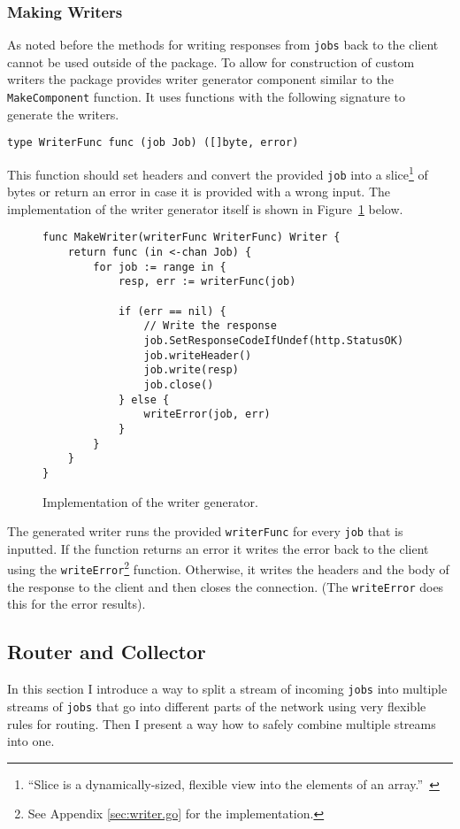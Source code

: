 \subsubsection{Making Writers}
As noted before the methods for writing responses from \texttt{jobs}
back to the client cannot be used outside of the package. To allow
for construction of custom writers the package provides writer generator
component similar to the \texttt{MakeComponent} function. It uses 
functions with the following signature to generate the writers.
\begin{lstlisting}
type WriterFunc func (job Job) ([]byte, error)
\end{lstlisting}
This function should set headers and convert the provided \texttt{job} into 
a slice\footnote{``Slice is a dynamically-sized, flexible view into the elements 
of an array.''~\cite{tour}} of bytes or return an error in case it 
is provided with a 
wrong input. The implementation of the writer generator itself is shown
in Figure~\ref{fig:MakeWriter} below.
\begin{figure}[h]
\centering
\begin{lstlisting}
func MakeWriter(writerFunc WriterFunc) Writer {
    return func (in <-chan Job) {
        for job := range in {
            resp, err := writerFunc(job)

            if (err == nil) {
                // Write the response
                job.SetResponseCodeIfUndef(http.StatusOK)
                job.writeHeader()
                job.write(resp)
                job.close()
            } else {
                writeError(job, err)
            }
        }       
    }
}
\end{lstlisting}
\caption[scale=1.0]{Implementation of the writer generator.}
\label{fig:MakeWriter}
\end{figure}

The generated writer runs the provided \texttt{writerFunc} for every \texttt{job} 
that is inputted. If the function returns an error it writes the error 
back to the client using the \texttt{writeError}\footnote{See Appendix 
\ref{sec:writer.go} for the implementation.} function. Otherwise, it 
writes the headers and the body of the response to the client and then 
closes the connection. (The \texttt{writeError} does this for the error
results).

\subsection{Router and Collector}
In this section I introduce a way to split a stream of incoming \texttt{jobs} into
multiple streams of \texttt{jobs} that go into different parts of the network
using very flexible rules for routing. Then I present a way how to
safely combine multiple streams into one.

